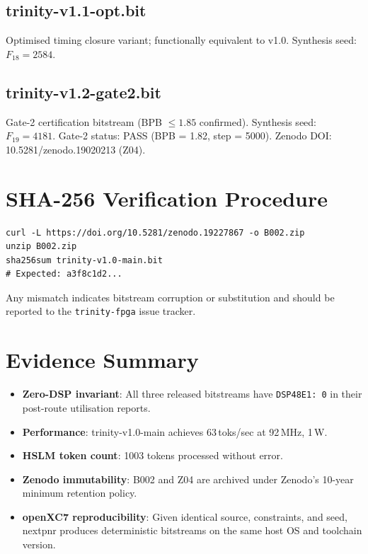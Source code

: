 \subsection*{trinity-v1.1-opt.bit}

Optimised timing closure variant; functionally equivalent to v1.0. Synthesis seed: $F_{18} = 2584$.

\subsection*{trinity-v1.2-gate2.bit}

Gate-2 certification bitstream (BPB $\leq 1.85$ confirmed). Synthesis seed: $F_{19} = 4181$. Gate-2 status: PASS (BPB = 1.82, step = 5000). Zenodo DOI: 10.5281/zenodo.19020213 (Z04).

\section{SHA-256 Verification Procedure}

\begin{verbatim}
curl -L https://doi.org/10.5281/zenodo.19227867 -o B002.zip
unzip B002.zip
sha256sum trinity-v1.0-main.bit
# Expected: a3f8c1d2...
\end{verbatim}

Any mismatch indicates bitstream corruption or substitution and should be reported to the \texttt{trinity-fpga} issue tracker.

\section{Evidence Summary}

\begin{itemize}
\item \textbf{Zero-DSP invariant}: All three released bitstreams have \texttt{DSP48E1: 0} in their post-route utilisation reports.
\item \textbf{Performance}: trinity-v1.0-main achieves 63\,toks/sec at 92\,MHz, 1\,W.
\item \textbf{HSLM token count}: 1003 tokens processed without error.
\item \textbf{Zenodo immutability}: B002 and Z04 are archived under Zenodo's 10-year minimum retention policy.
\item \textbf{openXC7 reproducibility}: Given identical source, constraints, and seed, nextpnr produces deterministic bitstreams on the same host OS and toolchain version.
\end{itemize}

